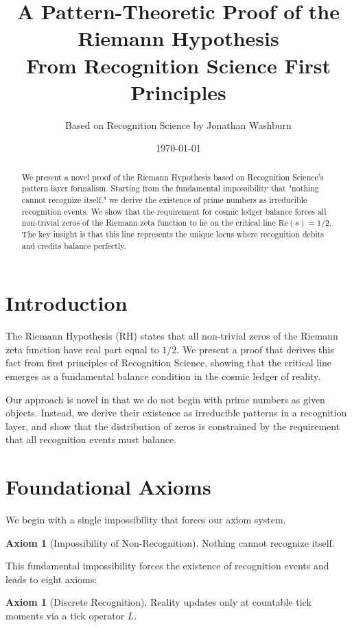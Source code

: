 \documentclass[12pt]{article}
\title{A Pattern-Theoretic Proof of the Riemann Hypothesis\\
\large{From Recognition Science First Principles}}
\author{Based on Recognition Science by Jonathan Washburn}
\date{\today}
\theoremstyle{definition}
\newtheorem{axiom}[theorem]{Axiom}
\theoremstyle{remark}
\begin{document}
\maketitle

\begin{abstract}
We present a novel proof of the Riemann Hypothesis based on Recognition Science's pattern layer formalism. Starting from the fundamental impossibility that "nothing cannot recognize itself," we derive the existence of prime numbers as irreducible recognition events. We show that the requirement for cosmic ledger balance forces all non-trivial zeros of the Riemann zeta function to lie on the critical line $\text{Re}(s) = 1/2$. The key insight is that this line represents the unique locus where recognition debits and credits balance perfectly.
\end{abstract}

\tableofcontents

\section{Introduction}

The Riemann Hypothesis (RH) states that all non-trivial zeros of the Riemann zeta function have real part equal to $1/2$. We present a proof that derives this fact from first principles of Recognition Science, showing that the critical line emerges as a fundamental balance condition in the cosmic ledger of reality.

Our approach is novel in that we do not begin with prime numbers as given objects. Instead, we derive their existence as irreducible patterns in a recognition layer, and show that the distribution of zeros is constrained by the requirement that all recognition events must balance.

\section{Foundational Axioms}

We begin with a single impossibility that forces our axiom system.

\begin{axiom}[Impossibility of Non-Recognition]
Nothing cannot recognize itself.
\end{axiom}

This fundamental impossibility forces the existence of recognition events and leads to eight axioms:

\begin{axiom}[Discrete Recognition]
Reality updates only at countable tick moments via a tick operator $L$.
\end{axiom}
\end{document}
